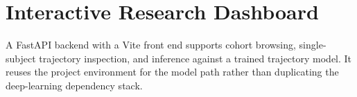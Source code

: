 \section{Interactive Research Dashboard}
\label{sec:dashboard}

A FastAPI backend with a Vite front end supports cohort browsing, single-subject trajectory
inspection, and inference against a trained trajectory model. It reuses the project
environment for the model path rather than duplicating the deep-learning dependency stack.

